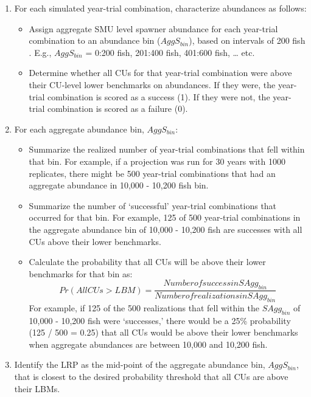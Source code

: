 \documentclass[11pt]{book}
\begin{document}
\begin{enumerate}
\def\labelenumi{\arabic{enumi}.}
\setcounter{enumi}{1}
\item
  For each simulated year-trial combination, characterize abundances as follows:
  \begin{itemize}
  \item
    Assign aggregate SMU level spawner abundance for each year-trial combination to an abundance bin (\(AggS_{bin}\)), based on intervals of 200 fish . E.g., \(AggS_{bin}\) = 0:200 fish, 201:400 fish, 401:600 fish, \ldots{} etc.
  \item
    Determine whether all CUs for that year-trial combination were above their CU-level lower benchmarks on abundances. If they were, the year-trial combination is scored as a success (1). If they were not, the year-trial combination is scored as a failure (0).
  \end{itemize}
\item
  For each aggregate abundance bin, \(AggS_{bin}\):
  \begin{itemize}
  \item
    Summarize the realized number of year-trial combinations that fell within that bin. For example, if a projection was run for 30 years with 1000 replicates, there might be 500 year-trial combinations that had an aggregate abundance in 10,000 - 10,200 fish bin.
  \item
    Summarize the number of `successful' year-trial combinations that occurred for that bin. For example, 125 of 500 year-trial combinations in the aggregate abundance bin of 10,000 - 10,200 fish are successes with all CUs above their lower benchmarks.
  \item
    Calculate the probability that all CUs will be above their lower benchmarks for that bin as: \begin{equation}
     Pr(All CUs > LBM) = \frac{Number of success in SAgg_{bin}} {Number of realizations in SAgg_{bin}}
     \label{eq:projBins}
    \end{equation} For example, if 125 of the 500 realizations that fell within the \(SAgg_{bin}\) of 10,000 - 10,200 fish were `successes,' there would be a 25\% probability (125 / 500 = 0.25) that all CUs would be above their lower benchmarks when aggregate abundances are between 10,000 and 10,200 fish.
  \end{itemize}
\item
  Identify the LRP as the mid-point of the aggregate abundance bin, \(AggS_{bin}\), that is closest to the desired probability threshold that all CUs are above their LBMs.
\end{enumerate}
\end{document}
